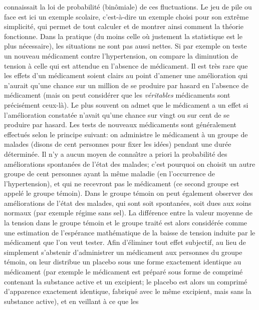 connaissait la loi de probabilit\'e (bin\^omiale) de ces fluctuations. 
\medskip
Le jeu de pile ou face est ici un exemple scolaire, c'est-\`a-dire un exemple
choisi pour son extr\^eme simplicit\'e, qui permet de tout calculer et de 
montrer ainsi comment la th\'eorie fonctionne. Dans la pratique (du moins 
celle o\`u justement la statistique est le plus n\'ecessaire), les situations 
ne sont pas aussi nettes. 
\medskip
Si par exemple on teste un nouveau m\'edicament 
contre l'hypertension, on compare la diminution de tension \`a celle qui est 
attendue en l'absence de m\'edicament. Il est tr\`es rare que les effets d'un 
m\'edicament soient clairs au point d'amener une am\'elioration qui 
n'aurait qu'une chance sur un million de se produire par hasard en l'absence 
de m\'edicament (mais on peut consid\'erer que les {\it v\'eritables} 
m\'edicaments sont pr\'ecis\'ement ceux-l\`a). Le plus souvent on admet 
que le m\'edicament a un effet si l'am\'elioration constat\'ee n'avait qu'une 
chance sur vingt ou sur cent de se produire par hasard. Les tests de 
nouveaux m\'edicaments sont g\'en\'eralement effectu\'es selon le 
principe suivant: on administre le m\'edicament \`a un groupe de malades 
(disons de cent personnes pour fixer les id\'ees) pendant une dur\'ee 
d\'etermin\'ee. Il n'y a aucun moyen de conna{\^\i}tre a priori la 
probabilit\'e des am\'eliorations spontan\'ees de l'\'etat des malades; c'est 
pourquoi on choisit un autre groupe de cent personnes ayant la m\^eme 
maladie (en l'occurrence de l'hypertension), et qui ne recevront pas le 
m\'edicament (ce second groupe est appel\'e le groupe t\'emoin). Dans le 
groupe t\'emoin on peut \'egalement observer des am\'eliorations de 
l'\'etat des malades, qui sont soit spontan\'ees, soit dues aux soins 
normaux (par exemple r\'egime sans sel). La diff\'erence entre la valeur 
moyenne de la tension dans le groupe t\'emoin et le groupe trait\'e est
alors consid\'er\'ee comme une estimation de l'esp\'erance math\'ematique 
de la baisse de tension induite par le m\'edicament que l'on veut tester. 
\medskip
Afin d'\'eliminer tout effet subjectif, au lieu de simplement s'abstenir 
d'administrer un m\'edicament aux personnes du groupe t\'emoin, on leur 
distribue un placebo sous une forme exactement identique au m\'edicament 
(par exemple le m\'edicament est pr\'epar\'e sous forme de comprim\'e
contenant la substance active et un excipient; le placebo est alors un 
comprim\'e d'apparence exactement identique, fabriqu\'e avec le m\^eme 
excipient,  mais sans la substance active), et en veillant \`a ce que les 
